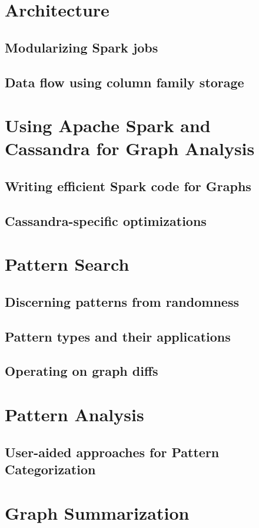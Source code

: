 \documentclass[
        a4paper,     %
        titlepage,   %
        twoside,     %
        parskip      %
        ]{scrartcl}  %
\begin{document}
  \section{Architecture}
    \subsection{Modularizing Spark jobs}
    \subsection{Data flow using column family storage}
  \section{Using Apache Spark and Cassandra for Graph Analysis}
    \subsection{Writing efficient Spark code for Graphs}
    \subsection{Cassandra-specific optimizations}
  \section{Pattern Search}
    \subsection{Discerning patterns from randomness}
    \subsection{Pattern types and their applications}
    \subsection{Operating on graph diffs}
  \section{Pattern Analysis}
    \subsection{User-aided approaches for Pattern Categorization}
  \section{Graph Summarization}
\end{document}
